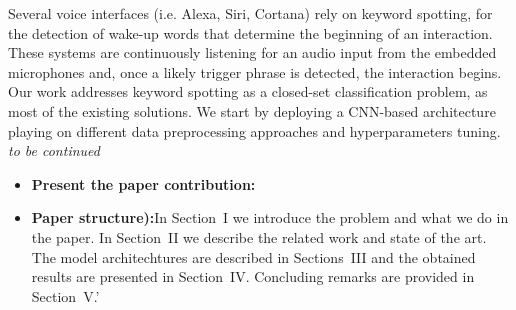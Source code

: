 \noindent  Several voice interfaces (i.e. Alexa, Siri, Cortana) rely on keyword spotting, for the detection of wake-up words that determine the beginning of an interaction. These systems are continuously listening for an audio input from the embedded microphones and, once a likely trigger phrase is detected, the interaction begins. 
Our work addresses keyword spotting as a closed-set classification problem, as most of the existing solutions. We start by deploying a CNN-based architecture playing on different data preprocessing approaches and hyperparameters tuning. {\it to be continued}
\begin{itemize} 
\item \textbf{Present the paper contribution:} 
\item \textbf{Paper structure):}In Section~I we introduce the problem and what we do in the paper. In Section~II we describe the related work and state of the art. The model architechtures are described in Sections~III and the obtained results are presented in Section~IV.  Concluding remarks are provided in Section~V.'
\end{itemize}


